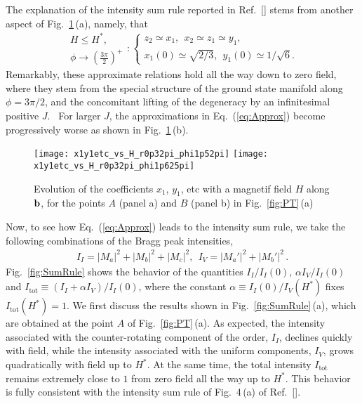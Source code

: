 \documentclass[prx,aps,groupedaddress,twocolumn]{revtex4-1}
\def\be{\begin{equation}}
\def\ee{\end{equation}}
\begin{document}
The explanation of the intensity sum rule reported in Ref.~[] stems from another aspect of Fig.~\ref{fig:x1y1etcvsH}\,(a), namely, that 
\be\label{eq:Approx}
\begin{array}{l}
H\!\le\!H^\ast,\\
 \phi\to\left(\frac{3\pi}{2}\right)^+
\end{array}\!\!:
\left\{\!\!
\begin{array}{l}
z_2\simeq x_1,~~x_2\simeq z_1\simeq y_1,\\
x_1(0)\simeq\sqrt{2/3},~~y_1(0)\simeq1/\sqrt{6}.
\end{array}\right.
\ee
Remarkably, these approximate relations hold all the way down to zero field, where they stem from the special structure of the ground state manifold along $\phi\!=\!3\pi/2$, and the concomitant lifting of the degeneracy  by an infinitesimal positive $J$.~\cite{Sam2018}  
%
For larger $J$, the approximations in Eq.~(\ref{eq:Approx}) become progressively worse as shown in Fig.~\ref{fig:x1y1etcvsH}\,(b). 


 
\begin{figure}[!t]
\texttt{[image: x1y1etc\_vs\_H\_r0p32pi\_phi1p52pi]}
\texttt{[image: x1y1etc\_vs\_H\_r0p32pi\_phi1p625pi]}
\caption{Evolution of the coefficients $x_1$, $y_1$, etc with a magnetif field $H$ along ${\bf b}$, for the points $A$ (panel a) and $B$ (panel b) in Fig.~\ref{fig:PT}\,(a)}
\vspace*{-0.25cm}
\label{fig:x1y1etcvsH}
\end{figure}  

Now, to see how Eq.~(\ref{eq:Approx}) leads to the intensity sum rule, we take the following combinations of the Bragg peak intensities,  
\be\label{eq:SumRule}
\begin{array}{l}
I_{I}\!=\!|M_a|^2\!+\!|M_b|^2\!+\!|M_c|^2, ~~
I_{V}\!=\!|M_a'|^2\!+\!|M_b'|^2\,.
\end{array}
\ee
%
Fig.~\ref{fig:SumRule} shows the behavior of the quantities $I_I/I_I(0)$, $\alpha I_V/I_I(0)$ and $I_{\text{tot}}\!\equiv\!(I_I+\alpha I_V)/I_I(0)$, where the constant $\alpha\!\equiv\!I_I(0)/I_V(H^\ast)$ fixes $I_{\text{tot}}(H^\ast)\!=\!1$. 
%
We first discuss the results shown in Fig.~\ref{fig:SumRule}\,(a), which are obtained at the point $A$ of Fig.~\ref{fig:PT}\,(a). 
%
As expected, the intensity associated with the counter-rotating component of the order, $I_I$, declines quickly with field, while the intensity associated with the uniform components, $I_V$, grows quadratically with field up to $H^\ast$. 
%
At the same time, the total intensity $I_{\text{tot}}$ remains extremely close to $1$ from zero field all the way up to $H^\ast$. This behavior is fully consistent with the intensity sum rule of Fig.~4\,(a) of Ref.~[].
\end{document}
